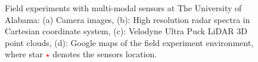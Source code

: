 \documentclass[conference]{IEEEtran}
\begin{document}
\begin{figure}[!b]
 \centering
{}
\vspace{-2mm}
\caption{Field experiments  with multi-modal sensors  at The University of Alabama:  (a) Camera images, (b): High resolution radar spectra in Cartesian coordinate system, (c): Velodyne Ultra Puck LiDAR 3D point clouds, (d): Google maps  of the field experiment environment, where star \textcolor{red}{$\star$} denotes the sensors location.}
\vspace{0mm}
\label{Radar_data_representation_example}
\end{figure}
\end{document}
